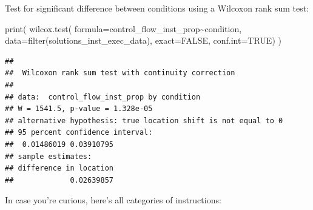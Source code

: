 \documentclass[
]{book}
\newenvironment{Shaded}{\begin{snugshade}}{\end{snugshade}}
\newcommand{\AttributeTok}[1]{\textcolor[rgb]{0.77,0.63,0.00}{#1}}
\newcommand{\ConstantTok}[1]{\textcolor[rgb]{0.00,0.00,0.00}{#1}}
\newcommand{\FunctionTok}[1]{\textcolor[rgb]{0.00,0.00,0.00}{#1}}
\newcommand{\NormalTok}[1]{#1}
\newcommand{\SpecialCharTok}[1]{\textcolor[rgb]{0.00,0.00,0.00}{#1}}
\begin{document}
Test for significant difference between conditions using a Wilcoxon rank sum test:

\begin{Shaded}
\begin{Highlighting}[]
\FunctionTok{print}\NormalTok{(}
  \FunctionTok{wilcox.test}\NormalTok{(}
    \AttributeTok{formula=}\NormalTok{control\_flow\_inst\_prop}\SpecialCharTok{\textasciitilde{}}\NormalTok{condition,}
    \AttributeTok{data=}\FunctionTok{filter}\NormalTok{(solutions\_inst\_exec\_data),}
    \AttributeTok{exact=}\ConstantTok{FALSE}\NormalTok{,}
    \AttributeTok{conf.int=}\ConstantTok{TRUE}\NormalTok{)}
\NormalTok{)}
\end{Highlighting}
\end{Shaded}

\begin{verbatim}
## 
##  Wilcoxon rank sum test with continuity correction
## 
## data:  control_flow_inst_prop by condition
## W = 1541.5, p-value = 1.328e-05
## alternative hypothesis: true location shift is not equal to 0
## 95 percent confidence interval:
##  0.01486019 0.03910795
## sample estimates:
## difference in location 
##             0.02639857
\end{verbatim}

In case you're curious, here's all categories of instructions:
\end{document}
